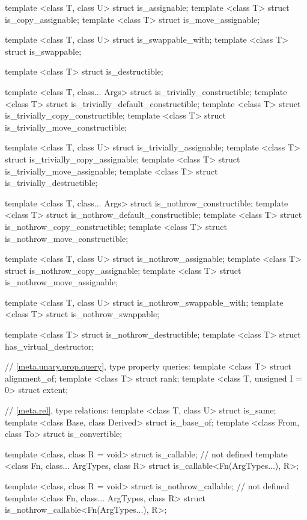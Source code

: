 \begin{codeblock}
{  template <class T, class U> struct is_assignable;
  template <class T> struct is_copy_assignable;
  template <class T> struct is_move_assignable;

  template <class T, class U> struct is_swappable_with;
  template <class T> struct is_swappable;

  template <class T> struct is_destructible;

  template <class T, class... Args> struct is_trivially_constructible;
  template <class T> struct is_trivially_default_constructible;
  template <class T> struct is_trivially_copy_constructible;
  template <class T> struct is_trivially_move_constructible;

  template <class T, class U> struct is_trivially_assignable;
  template <class T> struct is_trivially_copy_assignable;
  template <class T> struct is_trivially_move_assignable;
  template <class T> struct is_trivially_destructible;

  template <class T, class... Args> struct is_nothrow_constructible;
  template <class T> struct is_nothrow_default_constructible;
  template <class T> struct is_nothrow_copy_constructible;
  template <class T> struct is_nothrow_move_constructible;

  template <class T, class U> struct is_nothrow_assignable;
  template <class T> struct  is_nothrow_copy_assignable;
  template <class T> struct is_nothrow_move_assignable;

  template <class T, class U> struct is_nothrow_swappable_with;
  template <class T> struct is_nothrow_swappable;

  template <class T> struct is_nothrow_destructible;
  template <class T> struct has_virtual_destructor;

  // \ref{meta.unary.prop.query}, type property queries:
  template <class T> struct alignment_of;
  template <class T> struct rank;
  template <class T, unsigned I = 0> struct extent;

  // \ref{meta.rel}, type relations:
  template <class T, class U> struct is_same;
  template <class Base, class Derived> struct is_base_of;
  template <class From, class To> struct is_convertible;

  template <class, class R = void> struct is_callable; // not defined
  template <class Fn, class... ArgTypes, class R>
    struct is_callable<Fn(ArgTypes...), R>;
     
  template <class, class R = void> struct is_nothrow_callable; // not defined
  template <class Fn, class... ArgTypes, class R>
    struct is_nothrow_callable<Fn(ArgTypes...), R>;

}
\end{codeblock}
